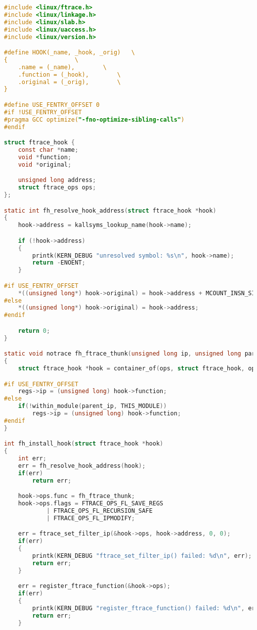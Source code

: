 \begin{lstlisting}[language=C, label=lst:ftrace_helper_h, caption=ftrace\_helper.h.]
#include <linux/ftrace.h>
#include <linux/linkage.h>
#include <linux/slab.h>
#include <linux/uaccess.h>
#include <linux/version.h>

#define HOOK(_name, _hook, _orig)   \
{                   \
    .name = (_name),        \
    .function = (_hook),        \
    .original = (_orig),        \
}

#define USE_FENTRY_OFFSET 0
#if !USE_FENTRY_OFFSET
#pragma GCC optimize("-fno-optimize-sibling-calls")
#endif

struct ftrace_hook {
    const char *name;
    void *function;
    void *original;

    unsigned long address;
    struct ftrace_ops ops;
};

static int fh_resolve_hook_address(struct ftrace_hook *hook)
{
    hook->address = kallsyms_lookup_name(hook->name);

    if (!hook->address)
    {
        printk(KERN_DEBUG "unresolved symbol: %s\n", hook->name);
        return -ENOENT;
    }

#if USE_FENTRY_OFFSET
    *((unsigned long*) hook->original) = hook->address + MCOUNT_INSN_SIZE;
#else
    *((unsigned long*) hook->original) = hook->address;
#endif

    return 0;
}

static void notrace fh_ftrace_thunk(unsigned long ip, unsigned long parent_ip, struct ftrace_ops *ops, struct pt_regs *regs)
{
    struct ftrace_hook *hook = container_of(ops, struct ftrace_hook, ops);

#if USE_FENTRY_OFFSET
    regs->ip = (unsigned long) hook->function;
#else
    if(!within_module(parent_ip, THIS_MODULE))
        regs->ip = (unsigned long) hook->function;
#endif
}

int fh_install_hook(struct ftrace_hook *hook)
{
    int err;
    err = fh_resolve_hook_address(hook);
    if(err)
        return err;

    hook->ops.func = fh_ftrace_thunk;
    hook->ops.flags = FTRACE_OPS_FL_SAVE_REGS
            | FTRACE_OPS_FL_RECURSION_SAFE
            | FTRACE_OPS_FL_IPMODIFY;

    err = ftrace_set_filter_ip(&hook->ops, hook->address, 0, 0);
    if(err)
    {
        printk(KERN_DEBUG "ftrace_set_filter_ip() failed: %d\n", err);
        return err;
    }

    err = register_ftrace_function(&hook->ops);
    if(err)
    {
        printk(KERN_DEBUG "register_ftrace_function() failed: %d\n", err);
        return err;
    }


\end{lstlisting}
